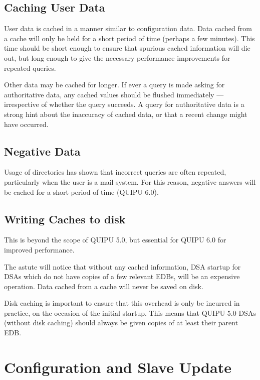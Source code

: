 \subsection {Caching User Data}

User data is cached in a manner similar to configuration data.  Data cached
from a cache will only be held for a short period of time (perhaps a few
minutes).  This time should be short enough to ensure that spurious cached
information will die out, but long enough to give the necessary performance
improvements for repeated queries.   

Other data may be cached for longer.  If ever a query is made asking for
authoritative data, any cached values should be flushed immediately ---
irrespective of whether the query succeeds.  A query for authoritative data
is a strong hint about the inaccuracy of cached data, or that a recent
change might have occurred.

\subsection {Negative Data}

Usage of directories has shown that incorrect queries are often repeated,
particularly when the user is a mail system.  For this reason, negative
answers will be cached for a short period of time (QUIPU 6.0).

\subsection {Writing Caches to disk}
\label {disk-cache}

This is beyond the scope of QUIPU 5.0, but essential for QUIPU 6.0 for
improved performance. 

The astute will notice that without any cached information, DSA startup for
DSAs which do not have copies of a few relevant EDBs, will be an expensive
operation.  
Data cached from a cache will never be saved on disk.  

Disk caching is important to ensure that this overhead is only be incurred
in practice, on the occasion of the initial startup.  This means that QUIPU
5.0 DSAs (without disk caching) should always be given copies of at least
their parent EDB.

\section {Configuration and Slave Update}

